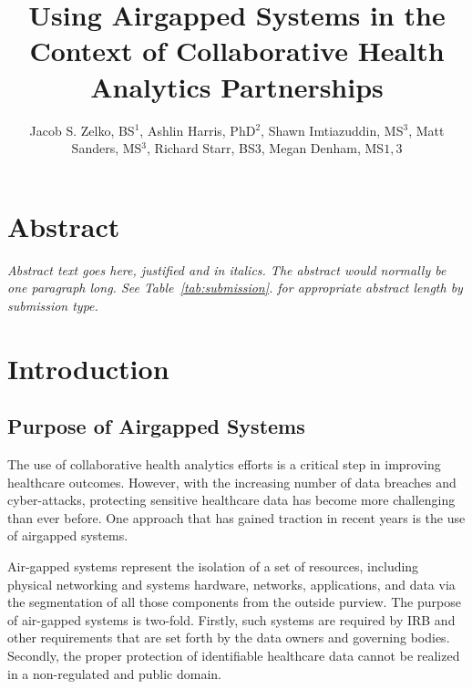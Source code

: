 \documentclass{amia}
\begin{document}
\title{Using Airgapped Systems in the Context of Collaborative Health Analytics Partnerships}

\author{Jacob S. Zelko, BS$^1$, Ashlin Harris, PhD$^2$, Shawn Imtiazuddin, MS$^3$, Matt Sanders, MS$^3$, Richard Starr, BS$3$, Megan Denham, MS$1,3$}


\maketitle

\section*{Abstract}

\textit{Abstract text goes here, justified and in italics.  The abstract would normally be one paragraph long.  See Table~\ref{tab:submission}. for appropriate abstract length by submission type.}

\section*{Introduction}

\subsection*{Purpose of Airgapped Systems}

The use of collaborative health analytics efforts is a critical step in improving healthcare outcomes. However, with the increasing number of data breaches and cyber-attacks, protecting sensitive healthcare data has become more challenging than ever before. One approach that has gained traction in recent years is the use of airgapped systems.

Air-gapped systems represent the isolation of a set of resources, including physical networking and systems hardware, networks, applications, and data via the segmentation of all those components from the outside purview. The purpose of air-gapped systems is two-fold. Firstly, such systems are required by IRB and other requirements that are set forth by the data owners and governing bodies. Secondly, the proper protection of identifiable healthcare data cannot be realized in a non-regulated and public domain.
\end{document}
